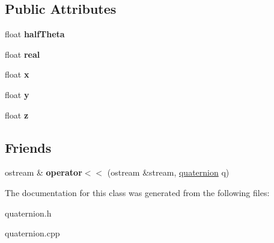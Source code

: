 \subsection*{Public Attributes}
\begin{DoxyCompactItemize}
\item 
\hypertarget{classquaternion_afc4d682e123ddfae28e9649c865d976a}{float {\bfseries half\-Theta}}\label{classquaternion_afc4d682e123ddfae28e9649c865d976a}

\item 
\hypertarget{classquaternion_a3eea7bafcb4e141b0923f4302896e49a}{float {\bfseries real}}\label{classquaternion_a3eea7bafcb4e141b0923f4302896e49a}

\item 
\hypertarget{classquaternion_acdcda48f9dd7ff35873aae38fa33ab78}{float {\bfseries x}}\label{classquaternion_acdcda48f9dd7ff35873aae38fa33ab78}

\item 
\hypertarget{classquaternion_a48e3d1fbf5e12eb54985c32b45dd8303}{float {\bfseries y}}\label{classquaternion_a48e3d1fbf5e12eb54985c32b45dd8303}

\item 
\hypertarget{classquaternion_a538598007238d399f79ddcecd39ef5cf}{float {\bfseries z}}\label{classquaternion_a538598007238d399f79ddcecd39ef5cf}

\end{DoxyCompactItemize}
\subsection*{Friends}
\begin{DoxyCompactItemize}
\item 
\hypertarget{classquaternion_a0043265a993146f9c2887f48013709da}{ostream \& {\bfseries operator$<$$<$} (ostream \&stream, \hyperlink{classquaternion}{quaternion} q)}\label{classquaternion_a0043265a993146f9c2887f48013709da}

\end{DoxyCompactItemize}


The documentation for this class was generated from the following files\-:\begin{DoxyCompactItemize}
\item 
quaternion.\-h\item 
quaternion.\-cpp\end{DoxyCompactItemize}
